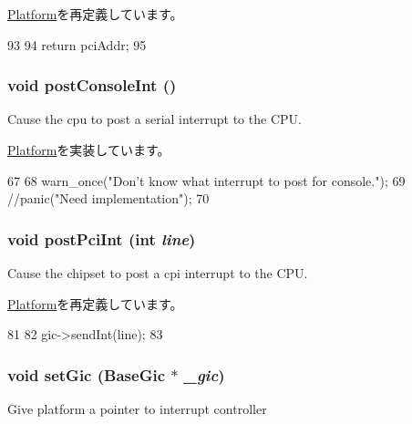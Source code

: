 \hyperlink{classPlatform_a87078b3d3a28ae134f6736337e90dac3}{Platform}を再定義しています。


\begin{DoxyCode}
93 {
94     return pciAddr;
95 }
\end{DoxyCode}
\hypertarget{classRealView_a5b278cebc0a62bc2195edf27f059ab1a}{
\subsubsection[{postConsoleInt}]{\setlength{\rightskip}{0pt plus 5cm}void postConsoleInt ()}}
\label{classRealView_a5b278cebc0a62bc2195edf27f059ab1a}
Cause the cpu to post a serial interrupt to the CPU. 

\hyperlink{classPlatform_a24ab6780a0fa391b19980027355ba467}{Platform}を実装しています。


\begin{DoxyCode}
67 {
68     warn_once("Don't know what interrupt to post for console.\n");
69     //panic("Need implementation\n");
70 }
\end{DoxyCode}
\hypertarget{classRealView_a545d1445357706d7259aa73104f44222}{
\subsubsection[{postPciInt}]{\setlength{\rightskip}{0pt plus 5cm}void postPciInt (int {\em line})}}
\label{classRealView_a545d1445357706d7259aa73104f44222}
Cause the chipset to post a cpi interrupt to the CPU. 

\hyperlink{classPlatform_a545d1445357706d7259aa73104f44222}{Platform}を再定義しています。


\begin{DoxyCode}
81 {
82     gic->sendInt(line);
83 }
\end{DoxyCode}
\hypertarget{classRealView_a266d7fe9183bc5876c86cf4a57820d0e}{
\subsubsection[{setGic}]{\setlength{\rightskip}{0pt plus 5cm}void setGic ({\bf BaseGic} $\ast$ {\em \_\-gic})}}
\label{classRealView_a266d7fe9183bc5876c86cf4a57820d0e}
Give platform a pointer to interrupt controller 


